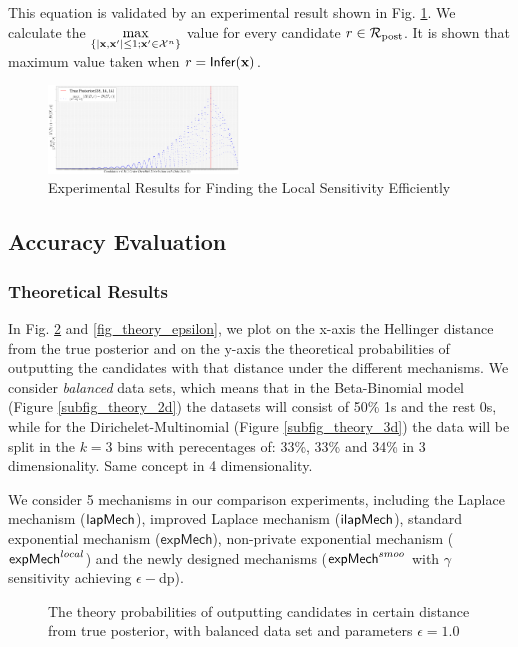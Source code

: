 \documentclass{article}
\begin{document}
This equation is validated by an experimental result shown in Fig. \ref{fig_efficiency}. We calculate the $\max\limits_{\{|\textbf{x},\textbf{x}'| \leq 1;\textbf{x}'\in \mathcal{X}^n\}}$ value for every candidate $r \in \mathcal{R}_{\textup{post}}$. It is shown that maximum value taken when  $r = \mathsf{Infer}(\textbf{x})$.

\begin{figure}[ht]
\centering
\includegraphics[width=0.45\textwidth]{efficiency.eps}
\caption{Experimental Results for Finding the Local Sensitivity Efficiently}
\label{fig_efficiency}
\end{figure}

\subsection{Accuracy Evaluation}
\subsubsection{Theoretical Results}
In Fig. \ref{fig_theory} and \ref{fig_theory_epsilon}, we plot on the x-axis the Hellinger distance from the true posterior and on the y-axis the theoretical probabilities of outputting the candidates with that distance under the different mechanisms. We consider \emph{balanced} data sets, which means that in the Beta-Binomial model (Figure \ref{subfig_theory_2d}) the datasets will consist of 50\% 1s and the rest 0s, while for the
Dirichelet-Multinomial (Figure  \ref{subfig_theory_3d})
the data will be split in the $k=3$ bins with perecentages of: 33\%, 33\% and 34\% in 3 dimensionality. Same concept in 4 dimensionality.

We consider 5 mechanisms in our comparison experiments, including the Laplace mechanism ($\mathsf{lapMech}$), improved Laplace mechanism ($\mathsf{ilapMech}$), standard exponential mechanism ($\mathsf{expMech}$), non-private exponential mechanism ($\mathsf{expMech}^{local}$) and the newly designed mechanisms ($\mathsf{expMech}^{smoo}$ with $\gamma$ sensitivity achieving $\epsilon-$dp).

\begin{figure}
\begin{center}
\centering
\caption{The theory probabilities of outputting candidates in certain distance from true posterior, with balanced data set and parameters $\epsilon = 1.0$}
\label{fig_theory}
\end{center}
\end{figure}
\end{document}
